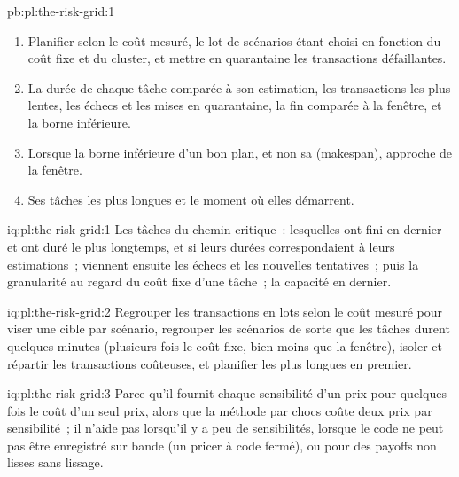 \begin{solution}{pb:pl:the-risk-grid:1}
\begin{enumerate}
de revalorisations par chocs des swaps par 60\,000 valorisations, et une relance incrémentale intrajournalière fait 1.5~millions d'appels au lieu de 105~millions.
\item Planifier selon le coût mesuré, le lot de scénarios étant choisi en fonction du coût fixe et du cluster, et mettre en quarantaine les transactions défaillantes.
\item La durée de chaque tâche comparée à son estimation, les transactions les plus lentes, les échecs et les mises en quarantaine, la fin comparée à la fenêtre, et la borne
inférieure.
\item Lorsque la borne inférieure d'un bon plan, et non sa  (makespan), approche de la fenêtre.
\item Ses tâches les plus longues et le moment où elles démarrent.
\end{enumerate}
\end{solution}

\begin{solution}{iq:pl:the-risk-grid:1}
Les tâches du chemin critique~: lesquelles ont fini en dernier et ont duré le plus longtemps, et si leurs durées correspondaient à leurs estimations~; viennent ensuite les échecs et les nouvelles tentatives~;
puis la granularité au regard du coût fixe d'une tâche~; la capacité en dernier.
\end{solution}

\begin{solution}{iq:pl:the-risk-grid:2}
Regrouper les transactions en lots selon le coût mesuré pour viser une cible par scénario, regrouper les scénarios de sorte que les tâches durent quelques minutes (plusieurs fois le coût fixe, bien moins que
la fenêtre), isoler et répartir les transactions coûteuses, et planifier les plus longues en premier.
\end{solution}

\begin{solution}{iq:pl:the-risk-grid:3}
Parce qu'il fournit chaque sensibilité d'un prix pour quelques fois le coût d'un seul prix, alors que la méthode par chocs coûte deux prix par sensibilité~; il n'aide pas
lorsqu'il y a peu de sensibilités, lorsque le code ne peut pas être enregistré sur bande (un pricer à code fermé), ou pour des payoffs non lisses sans lissage.
\end{solution}

